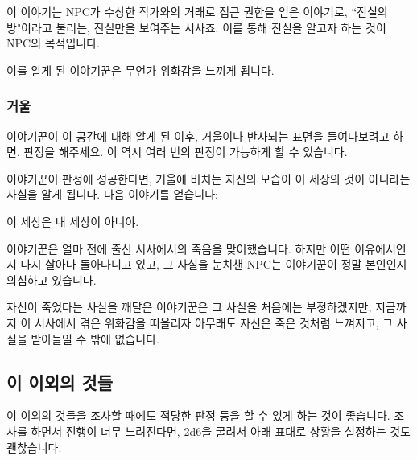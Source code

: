 \documentclass{report}
\begin{document}
	이 이야기는 NPC가 수상한 작가와의 거래로 접근 권한을 얻은 이야기로, ``진실의 방"이라고 불리는, 진실만을 보여주는 서사죠. 이를 통해 진실을 알고자 하는 것이 NPC의 목적입니다.
	
	이를 알게 된 이야기꾼은 무언가 위화감을 느끼게 됩니다.
	
	\hypertarget{poison:mirror}{}
	\subsubsection{거울}
	
	이야기꾼이 이 공간에 대해 알게 된 이후, 거울이나 반사되는 표면을 들여다보려고 하면, 판정을 해주세요. 이 역시 여러 번의 판정이 가능하게 할 수 있습니다.
	
	이야기꾼이 판정에 성공한다면, 거울에 비치는 자신의 모습이 이 세상의 것이 아니라는 사실을 알게 됩니다. 다음 이야기를 얻습니다:
	
	\begin{lite}{이 세상은 내 세상이 아니야.}
	\end{lite}
	
	이야기꾼은 얼마 전에 출신 서사에서의 죽음을 맞이했습니다. 하지만 어떤 이유에서인지 다시 살아나 돌아다니고 있고, 그 사실을 눈치챈 NPC는 이야기꾼이 정말 본인인지 의심하고 있습니다.
	
	자신이 죽었다는 사실을 깨달은 이야기꾼은 그 사실을 처음에는 부정하겠지만, 지금까지 이 서사에서 겪은 위화감을 떠올리자 아무래도 자신은 죽은 것처럼 느껴지고, 그 사실을 받아들일 수 밖에 없습니다.
	
	\subsection{이 이외의 것들}
	이 이외의 것들을 조사할 때에도 적당한 판정 등을 할 수 있게 하는 것이 좋습니다. 조사를 하면서 진행이 너무 느려진다면, 2d6을 굴려서 아래 표대로 상황을 설정하는 것도 괜찮습니다.
	
	\smallskip
	
\end{document}
